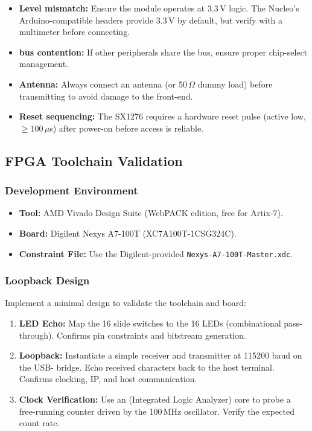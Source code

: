 \documentclass[11pt,letterpaper]{article}
\begin{document}
	\begin{tcolorbox}[warning={Common Pitfalls}]
		\begin{itemize}
			\item \textbf{Level mismatch:} Ensure the \RF{} module operates at 3.3\,V logic. The Nucleo's Arduino-compatible headers provide 3.3\,V by default, but verify with a multimeter before connecting.
			\item \textbf{\SPI{} bus contention:} If other \SPI{} peripherals share the bus, ensure proper chip-select management.
			\item \textbf{Antenna:} Always connect an antenna (or 50\,$\Omega$ dummy load) before transmitting to avoid damage to the \RF{} front-end.
			\item \textbf{Reset sequencing:} The SX1276 requires a hardware reset pulse (active low, $\geq 100$\,$\mu$s) after power-on before \SPI{} access is reliable.
		\end{itemize}
	\end{tcolorbox}
	
	\subsection{FPGA Toolchain Validation}
	
	\subsubsection{Development Environment}
	
	\begin{itemize}[leftmargin=2em]
		\item \textbf{Tool:} AMD Vivado Design Suite (WebPACK edition, free for Artix-7).
		\item \textbf{Board:} Digilent Nexys A7-100T (XC7A100T-1CSG324C).
		\item \textbf{Constraint File:} Use the Digilent-provided \texttt{Nexys-A7-100T-Master.xdc}.
	\end{itemize}
	
	\subsubsection{Loopback Design}
	
	Implement a minimal design to validate the toolchain and board:
	
	\begin{enumerate}[leftmargin=2em]
		\item \textbf{LED Echo:} Map the 16 slide switches to the 16 LEDs (combinational pass-through). Confirms pin constraints and bitstream generation.
		\item \textbf{\UART{} Loopback:} Instantiate a simple \UART{} receiver and transmitter at 115200 baud on the USB-\UART{} bridge. Echo received characters back to the host terminal. Confirms clocking, \UART{} IP, and host communication.
		\item \textbf{Clock Verification:} Use an \ILA{} (Integrated Logic Analyzer) core to probe a free-running counter driven by the 100\,MHz oscillator. Verify the expected count rate.
	\end{enumerate}
	
\end{document}
